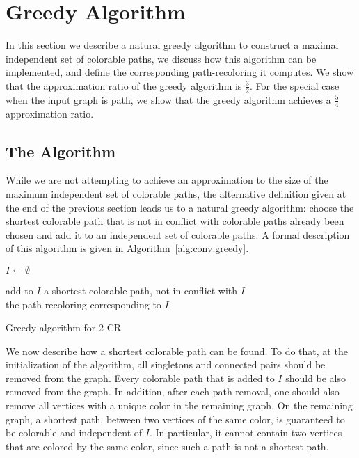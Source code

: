 \section{Greedy Algorithm}
\label{sec:greedy}

In this section we describe a natural greedy algorithm to construct a maximal
independent set of colorable paths, we discuss how this algorithm can be implemented,
and define the corresponding path-recoloring it computes.
%
We show that the approximation ratio of the greedy algorithm is $\frac{3}{2}$.
%
For the special case when the input graph is path, we show that the greedy algorithm achieves a $\frac{5}{4}$ approximation ratio.


\subsection{The Algorithm}

While we are not attempting to achieve an approximation to the size
of the maximum independent set of colorable paths,
the alternative definition given at the end of the previous section
leads us to a natural greedy algorithm: 
choose the shortest colorable path that 
is not in conflict with colorable paths already been chosen and add it
to an independent set of colorable paths.
%
A formal description of this algorithm is given in
Algorithm~\ref{alg:conv:greedy}.

\begin{algorithm}
\begin{algorithmic}

\State $I \gets \emptyset$

\State add to $I$ a shortest colorable path, not in conflict with $I$ 
\EndWhile
\\
\Return the path-recoloring corresponding to $I$


\end{algorithmic}
\caption{Greedy algorithm for 2-CR}
\label{alg:conv:greedy}
\end{algorithm}

We now describe how a shortest colorable path can be found.
%
To do that, 
at the initialization of the algorithm, 
all singletons and connected pairs should be removed from the graph.  
%
Every colorable path that is added to $I$ should be also removed from the graph.  
%
In addition, 
after each path removal, 
one should also remove all vertices with a unique color in the remaining graph.  
%
On the remaining graph, 
a shortest path, 
between two vertices of the same color, 
is guaranteed to be colorable and independent of $I$.
%
In particular,
it cannot contain two vertices that are colored by the same color, 
since such a path is not a shortest path.

